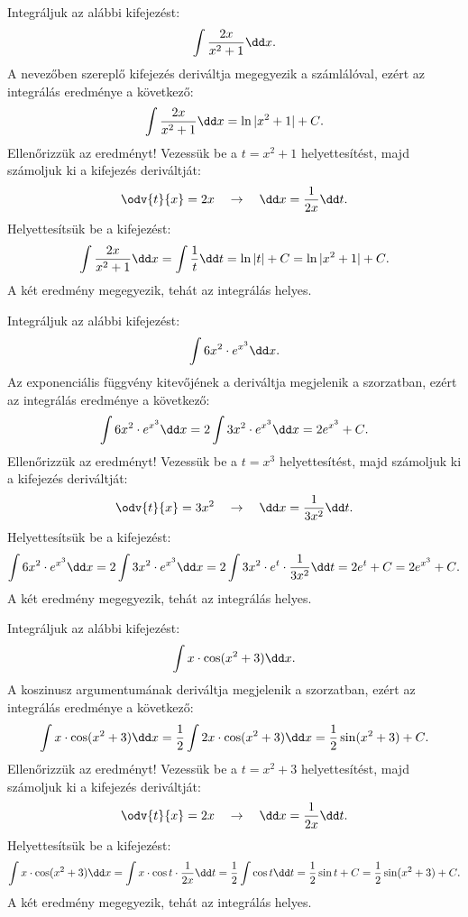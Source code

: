 \vfill

\begin{example}
  Integráljuk az alábbi kifejezést:
  \[
    \int \frac{2x}{x^2 + 1} \dd x
    \text.
  \]
  A nevezőben szereplő kifejezés deriváltja megegyezik a számlálóval, ezért az
  integrálás eredménye a következő:
  \[
    \int \frac{2x}{x^2 + 1} \dd x = \ln |x^2 + 1| + C
    \text.
  \]
  Ellenőrizzük az eredményt! Vezessük be a $t = x^2 + 1$ helyettesítést, majd
  számoljuk ki a kifejezés deriváltját:
  \[
    \odv{t}{x} = 2x
    \quad \rightarrow \quad
    \dd x = \frac{1}{2x} \dd t
    \text.
  \]
  Helyettesítsük be a kifejezést:
  \[
    \int \frac{2x}{x^2 + 1} \dd x
    = \int \frac{1}{t} \dd t
    = \ln |t| + C
    = \ln |x^2 + 1| + C
    \text.
  \]
  A két eredmény megegyezik, tehát az integrálás helyes.
\end{example}

\begin{example}
  Integráljuk az alábbi kifejezést:
  \[
    \int 6x^2 \cdot e^{x^3} \dd x
    \text.
  \]
  Az exponenciális függvény kitevőjének a deriváltja megjelenik a szorzatban,
  ezért az integrálás eredménye a következő:
  \[
    \int 6x^2 \cdot e^{x^3} \dd x
    = 2 \int 3x^2 \cdot e^{x^3} \dd x
    = 2 e^{x^3} + C
    \text.
  \]
  Ellenőrizzük az eredményt! Vezessük be a $t = x^3$ helyettesítést, majd
  számoljuk ki a kifejezés deriváltját:
  \[
    \odv{t}{x} = 3x^2
    \quad \rightarrow \quad
    \dd x = \frac{1}{3x^2} \dd t
    \text.
  \]
  Helyettesítsük be a kifejezést:
  \[
    \int 6x^2 \cdot e^{x^3} \dd x
    = 2 \int 3x^2 \cdot e^{x^3} \dd x
    = 2 \int 3x^2 \cdot e^t \cdot \frac{1}{3x^2} \dd t
    = 2 e^t + C
    = 2 e^{x^3} + C
    \text.
  \]
  A két eredmény megegyezik, tehát az integrálás helyes.
\end{example}

\vfill

\begin{mdframed}[style=example, nobreak=true]
  Integráljuk az alábbi kifejezést:
  \[
    \int x \cdot \cos (x^2 + 3) \dd x
    \text.
  \]
  A koszinusz argumentumának deriváltja megjelenik a szorzatban, ezért az
  integrálás eredménye a következő:
  \[
    \int x \cdot \cos (x^2 + 3) \dd x
    = \frac{1}{2} \int 2x \cdot \cos (x^2 + 3) \dd x
    = \frac{1}{2} \sin(x^2 + 3) + C
    \text.
  \]
  Ellenőrizzük az eredményt! Vezessük be a $t = x^2 + 3$ helyettesítést, majd
  számoljuk ki a kifejezés deriváltját:
  \[
    \odv{t}{x} = 2x
    \quad \rightarrow \quad
    \dd x = \frac{1}{2x} \dd t
    \text.
  \]
  Helyettesítsük be a kifejezést:
  \[
    \int x \cdot \cos (x^2 + 3) \dd x
    = \int x \cdot \cos t \cdot \frac{1}{2x} \dd t
    = \frac{1}{2} \int \cos t \dd t
    = \frac{1}{2} \sin t + C
    = \frac{1}{2} \sin(x^2 + 3) + C
    \text.
  \]
  A két eredmény megegyezik, tehát az integrálás helyes.
\end{mdframed}

